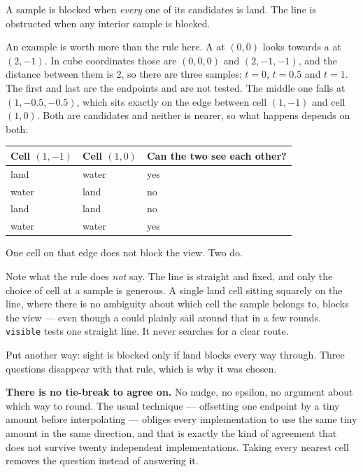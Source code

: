 \documentclass{article}
\begin{document}
\begin{center}
A sample is blocked when \emph{every} one of its candidates is land. The line is obstructed when
any interior sample is blocked.
\end{center}

An example is worth more than the rule here. A \ship{} at $(0,0)$ looks towards a \ship{} at
$(2,-1)$. In cube coordinates those are $(0,0,0)$ and $(2,-1,-1)$, and the distance between them is
$2$, so there are three samples: $t = 0$, $t = 0.5$ and $t = 1$. The first and last are the
endpoints and are not tested. The middle one falls at $(1, -0.5, -0.5)$, which sits exactly on the
edge between cell $(1,-1)$ and cell $(1,0)$. Both are candidates and neither is nearer, so what
happens depends on both:

\begin{center}
\begin{tabular}{|l|l|l|}
 \hline
 {\bf Cell $(1,-1)$} & {\bf Cell $(1,0)$} & {\bf Can the two \ships{} see each other?} \\
 \hline\hline
 land & water & yes \\
 \hline
 water & land & no \\
 \hline
 land & land & no \\
 \hline
 water & water & yes \\
 \hline
\end{tabular}
\end{center}

One \island{} cell on that edge does not block the view. Two do.

Note what the rule does \emph{not} say. The line is straight and fixed, and only the choice of cell
at a sample is generous. A single land cell sitting squarely on the line, where there is no
ambiguity about which cell the sample belongs to, blocks the view --- even though a \ship{} could
plainly sail around that \island{} in a few rounds. \texttt{visible} tests one straight line. It
never searches for a clear route.

Put another way: sight is blocked only if land blocks every way through. Three questions disappear
with that rule, which is why it was chosen.

\textbf{There is no tie-break to agree on.} No nudge, no epsilon, no argument about which way to
round. The usual technique --- offsetting one endpoint by a tiny amount before interpolating ---
obliges every implementation to use the same tiny amount in the same direction, and that is exactly
the kind of agreement that does not survive twenty independent implementations. Taking every
nearest cell removes the question instead of answering it.
\end{document}
